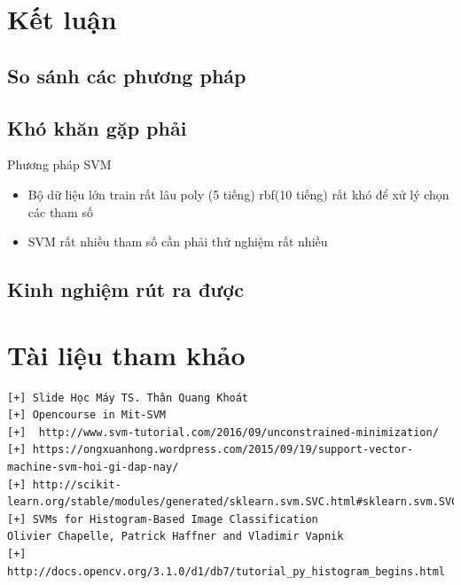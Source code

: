 \documentclass[a4paper,12pt]{report}
\begin{document}
\chapter{Kết luận}
\section{So sánh các phương pháp}
\section{Khó khăn gặp phải}
Phương pháp SVM
\begin{itemize}
\item Bộ dữ liệu lớn train rất lâu poly (5 tiếng) rbf(10 tiếng) rất khó để xử lý chọn các tham số 
\item SVM rất nhiều tham số cần phải thử nghiệm rất nhiều

\end{itemize}
\section{Kinh nghiệm rút ra được}
\chapter{Tài liệu tham khảo}
\begin{verbatim}
[+] Slide Học Máy TS. Thân Quang Khoát
[+] Opencourse in Mit-SVM 
[+]  http://www.svm-tutorial.com/2016/09/unconstrained-minimization/
[+] https://ongxuanhong.wordpress.com/2015/09/19/support-vector-machine-svm-hoi-gi-dap-nay/
[+] http://scikit-learn.org/stable/modules/generated/sklearn.svm.SVC.html#sklearn.svm.SVC 
[+] SVMs for Histogram-Based Image Classification
Olivier Chapelle, Patrick Haffner and Vladimir Vapnik
[+] http://docs.opencv.org/3.1.0/d1/db7/tutorial_py_histogram_begins.html


\end{verbatim}
\end{document}
